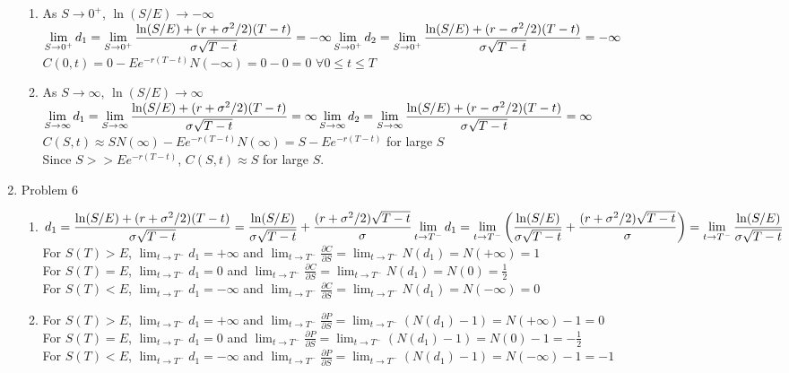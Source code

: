 \documentclass[a4paper]{article}
\def\lb{\left(}
\def\rb{\right)}
\begin{document}
\begin{enumerate}
\begin{enumerate}
\item
As $S\rightarrow 0^+$, $\ln(S/E)\rightarrow -\infty$\\
$\displaystyle\lim_{S\rightarrow 0^+}d_1=\lim_{S\rightarrow 0^+}\frac{\ln(S/E)+(r+\sigma^2/2)(T-t)}{\sigma\sqrt{T-t}}=-\infty\\
\lim_{S\rightarrow 0^+}d_2=\lim_{S\rightarrow 0^+}\frac{\ln(S/E)+(r-\sigma^2/2)(T-t)}{\sigma\sqrt{T-t}}=-\infty$\\
$C(0,t)=0-Ee^{-r(T-t)}N(-\infty)=0-0=0$ $\forall 0\leq t\leq T$

\item
As $S\rightarrow\infty$, $\ln(S/E)\rightarrow\infty$\\
$\displaystyle\lim_{S\rightarrow\infty}d_1=\lim_{S\rightarrow\infty}\frac{\ln(S/E)+(r+\sigma^2/2)(T-t)}{\sigma\sqrt{T-t}}=\infty\\
\lim_{S\rightarrow\infty}d_2=\lim_{S\rightarrow\infty}\frac{\ln(S/E)+(r-\sigma^2/2)(T-t)}{\sigma\sqrt{T-t}}=\infty$\\
$C(S,t)\approx SN(\infty)-Ee^{-r(T-t)}N(\infty)=S-Ee^{-r(T-t)}$ for large $S$\\
Since $S>>Ee^{-r(T-t)}$, $C(S,t)\approx S$ for large $S$.
\end{enumerate}

\pagebreak

\item Problem 6
\begin{enumerate}
\item
$\displaystyle d_1=\frac{\ln(S/E)+(r+\sigma^2/2)(T-t)}{\sigma\sqrt{T-t}}=\frac{\ln(S/E)}{\sigma\sqrt{T-t}}+\frac{(r+\sigma^2/2)\sqrt{T-t}}{\sigma}\\
\lim_{t\rightarrow T^-}d_1=\lim_{t\rightarrow T^-}\lb\frac{\ln(S/E)}{\sigma\sqrt{T-t}}+\frac{(r+\sigma^2/2)\sqrt{T-t}}{\sigma}\rb=\lim_{t\rightarrow T^-}\frac{\ln(S/E)}{\sigma\sqrt{T-t}}$\\
For $S(T)>E$, $\lim_{t\rightarrow T^-}d_1=+\infty$ and $\displaystyle \lim_{t\rightarrow T^-}\frac{\partial C}{\partial S} =\lim_{t\rightarrow T^-}N(d_1)=N(+\infty)=1$\\
For $S(T)=E$, $\lim_{t\rightarrow T^-}d_1=0$ and $\displaystyle \lim_{t\rightarrow T^-}\frac{\partial C}{\partial S} =\lim_{t\rightarrow T^-}N(d_1)=N(0)=\frac{1}{2}$\\
For $S(T)<E$, $\lim_{t\rightarrow T^-}d_1=-\infty$ and $\displaystyle \lim_{t\rightarrow T^-}\frac{\partial C}{\partial S} =\lim_{t\rightarrow T^-}N(d_1)=N(-\infty)=0$

\item
For $S(T)>E$, $\lim_{t\rightarrow T^-}d_1=+\infty$ and $\displaystyle \lim_{t\rightarrow T^-}\frac{\partial P}{\partial S} =\lim_{t\rightarrow T^-}(N(d_1)-1)=N(+\infty)-1=0$\\
For $S(T)=E$, $\lim_{t\rightarrow T^-}d_1=0$ and $\displaystyle \lim_{t\rightarrow T^-}\frac{\partial P}{\partial S} =\lim_{t\rightarrow T^-}(N(d_1)-1)=N(0)-1=-\frac{1}{2}$\\
For $S(T)<E$, $\lim_{t\rightarrow T^-}d_1=-\infty$ and $\displaystyle \lim_{t\rightarrow T^-}\frac{\partial P}{\partial S} =\lim_{t\rightarrow T^-}(N(d_1)-1)=N(-\infty)-1=-1$


\end{enumerate}
\end{enumerate}
\end{document}
